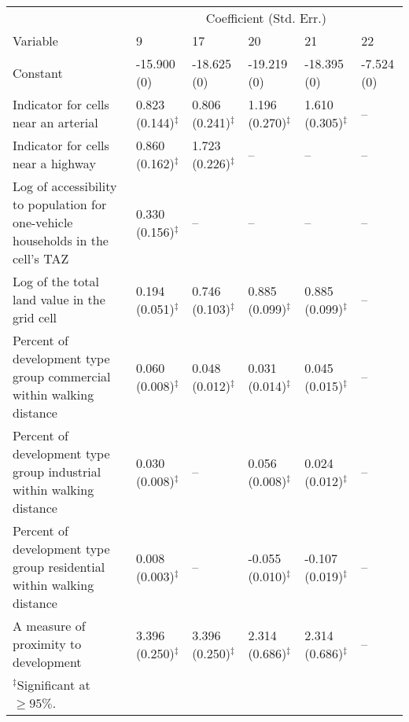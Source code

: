 
\begin{tabular}{p{3in}p{0.5in}p{0.5in}p{0.5in}p{0.5in}p{0.5in}}
\toprule
& \multicolumn{5}{c}{Coefficient (Std. Err.)}\\
\cmidrule{2-6} Variable    &   9   &   17  &   20  &   21  &    22
\\
\midrule
Constant    &    -15.900 (0)    &    -18.625 (0)    &    -19.219 (0)    &    -18.395 (0)    &    -7.524 (0) \\
Indicator for cells near an arterial    &    0.823 (0.144)$^{\ddagger}$     &    0.806 (0.241)$^{\ddagger}$     &    1.196 (0.270)$^{\ddagger}$     &    1.610 (0.305)$^{\ddagger}$     &    -- \\
Indicator for cells near a highway  &    0.860 (0.162)$^{\ddagger}$     &    1.723 (0.226)$^{\ddagger}$     &    --     &    --     &    -- \\
Log of accessibility to population for one-vehicle households in the cell's TAZ     &    0.330 (0.156)$^{\ddagger}$     &    --     &    --     &    --     &    -- \\
Log of the total land value in the grid cell    &    0.194 (0.051)$^{\ddagger}$     &    0.746 (0.103)$^{\ddagger}$     &    0.885 (0.099)$^{\ddagger}$     &    0.885 (0.099)$^{\ddagger}$     &    -- \\
Percent of development type group commercial within walking distance    &    0.060 (0.008)$^{\ddagger}$     &    0.048 (0.012)$^{\ddagger}$     &    0.031 (0.014)$^{\ddagger}$     &    0.045 (0.015)$^{\ddagger}$     &    -- \\
Percent of development type group industrial within walking distance    &    0.030 (0.008)$^{\ddagger}$     &    --     &    0.056 (0.008)$^{\ddagger}$     &    0.024 (0.012)$^{\ddagger}$     &    -- \\
Percent of development type group residential within walking distance   &    0.008 (0.003)$^{\ddagger}$     &    --     &    -0.055 (0.010)$^{\ddagger}$    &    -0.107 (0.019)$^{\ddagger}$    &    -- \\
A measure of proximity to development   &    3.396 (0.250)$^{\ddagger}$     &    3.396 (0.250)$^{\ddagger}$     &    2.314 (0.686)$^{\ddagger}$     &    2.314 (0.686)$^{\ddagger}$     &    -- \\
\midrule
$^{\ddagger}$Significant at $\geq95\%$. \\
\bottomrule
\end{tabular}
